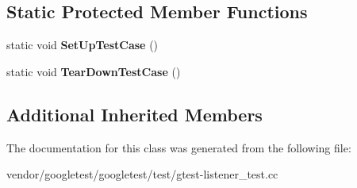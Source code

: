 \subsection*{Static Protected Member Functions}
\begin{DoxyCompactItemize}
\item 
\mbox{\label{classtesting_1_1internal_1_1_listener_test_a7cbc298576e584b4021d0375204b7391}} 
static void {\bfseries Set\+Up\+Test\+Case} ()
\item 
\mbox{\label{classtesting_1_1internal_1_1_listener_test_aa35b5f1c6235f0fe98aa2c7f35bb8fe1}} 
static void {\bfseries Tear\+Down\+Test\+Case} ()
\end{DoxyCompactItemize}
\subsection*{Additional Inherited Members}


The documentation for this class was generated from the following file\+:\begin{DoxyCompactItemize}
\item 
vendor/googletest/googletest/test/gtest-\/listener\+\_\+test.\+cc\end{DoxyCompactItemize}
